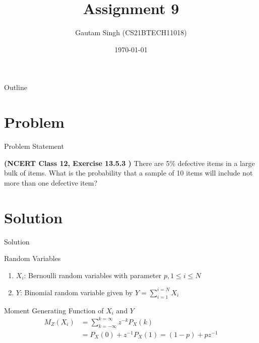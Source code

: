 \documentclass{beamer}
\title{Assignment 9}
\author{Gautam Singh (CS21BTECH11018)}
\date{\today}
\begin{document}
\begin{frame}
    \titlepage 
\end{frame}

\begin{frame}{Outline}
    \tableofcontents
\end{frame}


\section{Problem}
\begin{frame}{Problem Statement}

\textbf{(NCERT Class 12, Exercise 13.5.3 )} There are 5\% defective items in a large bulk of items. What is the probability that a sample of 10 items will include not more than one defective item?

\end{frame}


\section{Solution}
\begin{frame}{Solution}
    \begin{block}{Random Variables}
        \begin{enumerate}
        		\item $X_i$: Bernoulli random variables with parameter $p, 1 \leq i \leq N$
        		\item $Y$: Binomial random variable given by $Y = \sum_{i = 1}^{i = N}X_i$
        \end{enumerate}
    \end{block}
    \begin{exampleblock}{Moment Generating Function of $X_i$ and $Y$}
		\begin{align}
			M_Z(X_i) &= \sum_{k = -\infty}^{k = \infty}z^{-k}P_X(k) \\
			&= P_X(0) + z^{-1}P_X(1) = (1 - p) + pz^{-1} \\
			\label{mgf-X}
		\end{align}
    \end{exampleblock}
\end{frame} 
\end{document}
